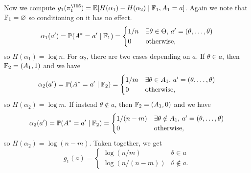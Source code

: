 \documentclass[11pt, openany]{book}
\begin{document}
\begin{example}
\begin{itemize}
\begin{itemize}
                        Now we compute $g_1(\pi_1^{\IDS}) = \E[H(\alpha_1)-H(\alpha_2)\given \F_1,A_1=a]$. Again we note that $\mathbb{F}_1=\varnothing$ so conditioning on it has no effect.
                        \[
                            \alpha_1(a') = \mathbb{P}(A^*=a'\mid\mathbb{F}_1) = \begin{cases}
                                1/n & \exists\theta\in\Theta, \, a' = (\theta,\dots,\theta) \\
                                0 & \text{otherwise},
                            \end{cases}
                        \]
                        so $H(\alpha_1)=\log n$. For $\alpha_2$, there are two cases depending on $a$. If $\theta\in a$, then $\mathbb{F}_2=(A_1,1)$ and we have
                        \[
                            \alpha_2(a') = \mathbb{P}(A^* = a'\mid\mathbb{F}_2) = \begin{cases}
                                1/m & \exists\theta\in A_1, \, a'=(\theta,\dots,\theta) \\
                                0 & \text{otherwise},
                            \end{cases}
                        \]
                        so $H(\alpha_2)=\log m$. If instead $\theta\notin a$, then $\mathbb{F}_2=(A_1,0)$ and we have
                        \[
                            \alpha_2(a') = \mathbb{P}(A^* = a'\mid\mathbb{F}_2) = \begin{cases}
                                1/(n-m) & \exists\theta\notin A_1, \, a'=(\theta,\dots,\theta) \\
                                0 & \text{otherwise},
                            \end{cases}
                        \]
                        so $H(\alpha_2) = \log(n-m)$. Taken together, we get
                        \[
                            g_1(a) = \begin{cases}
                                \log(n/m) & \theta\in a \\
                                \log(n/(n-m)) & \theta\notin a.
                            \end{cases}
                        \]


\end{itemize}
\end{itemize}
\end{example}
\end{document}
